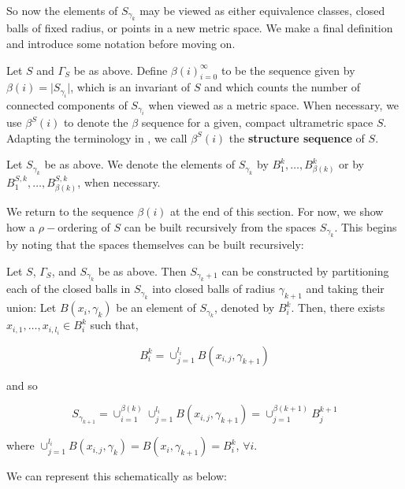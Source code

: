 So now the elements of $S_{\gamma_k}$ may be viewed as either equivalence classes, closed balls of fixed radius, or points in a new metric space. We  make a final definition and introduce some notation before moving on.

\begin{definition*}
Let $S$ and $\Gamma_S$ be as above. Define $\beta(i)_{i=0}^{\infty}$ to be the sequence given by $\beta(i) = \lvert  S_{\gamma_i}\rvert$, which is an invariant of $S$ and which counts the number of connected components of $S_{\gamma_i}$ when viewed as a metric space. When necessary, we use $\beta^S(i)$ to denote the $\beta$ sequence for a given, compact  ultrametric space $S$. Adapting the terminology in \cite{fp}, we call $\beta^S(i)$ the \textbf{structure sequence} of $S$.
\end{definition*}

\begin{notation*}
Let $S_{\gamma_k}$ be as above. We denote the elements of $S_{\gamma_k}$ by $B^k_1, \ldots, B^k_{\beta(k)}$ or by $B^{S,k}_1, \ldots, B^{S,k}_{\beta(k)}$, when necessary.
\end{notation*}


We return to the sequence $\beta(i)$ at the end of this section. For now, we show how a $\rho-$ordering of $S$ can be built recursively from the spaces $S_{\gamma_k}$. This begins by noting that the spaces themselves can be built recursively:

\begin{observation*}
Let $S$, $\Gamma_S$, and $S_{\gamma_k}$ be as above. Then $S_{\gamma_k+1}$ can be constructed by partitioning each of the closed balls in $S_{\gamma_k}$ into closed balls of radius $\gamma_{k+1}$ and taking their union:  Let $B(x_i, \gamma_k)$  be an element of $S_{\gamma_k}$, denoted by  $B^k_i$. Then, there exists $x_{i,1},\ldots, x_{i,l_{i}} \in B^k_i$ such that,

\[B^k_i=  \cup_{j=1}^{l_i} B(x_{i,j}, \gamma_{k+1})\] 

and so

\[S_{\gamma_{k+1}} =  \cup_{i=1}^{\beta(k)}   \cup_{j=1}^{l_i} B(x_{i,j}, \gamma_{k+1}) = \cup^{\beta(k+1)}_{j=1}B^{k+1}_{j}\] 


where $\cup_{j=1}^{l_i} B(x_{i,j},\gamma_{k})=B(x_i, \gamma_{k+1}) = B^k_i$, $\forall i$.
\end{observation*}

We can represent this schematically as below:

\tikzset{font=\small,
level distance=1.75cm,
}

